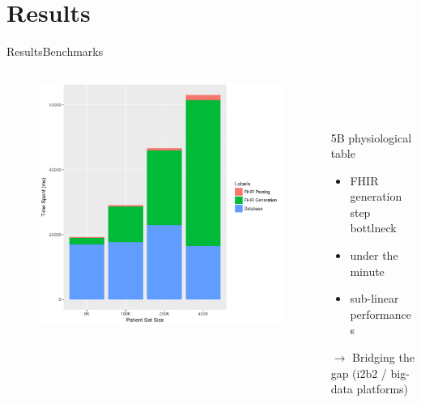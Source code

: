 \documentclass[10pt]{beamer}
\begin{document}
\section{Results}
\begin{frame}{Results}{Benchmarks}
 \begin{columns}[T,onlytextwidth]
        \begin{column}{.6\textwidth}
            \begin{onlyenv}
                \begin{minipage}{\textwidth}
                    \begin{figure}
\includegraphics[height=.7\textheight]{images/graph1.pdf}
                    \end{figure}
                \end{minipage}
            \end{onlyenv}
        \end{column}
        \begin{column}{.4\textwidth}
            \begin{onlyenv}
                \begin{minipage}{\textwidth}
			~\\
			~\\
			~\\
	5B physiological table
	\begin{itemize}
		\item FHIR generation step bottlneck
		\item under the minute
		\item sub-linear performances
	\end{itemize}
	$\rightarrow$ Bridging the gap (i2b2 / big-data platforms)
                \end{minipage}
            \end{onlyenv}
        \end{column}
    \end{columns} 

\end{frame}
\end{document}
